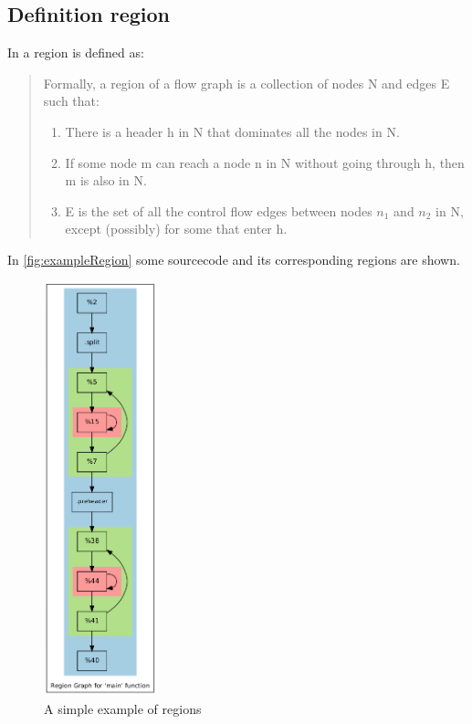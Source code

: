 \subsection{Definition region}
In \cite[chapter 9.7.1, p.~672]{Drachenbuch} a region is defined as:

\begin{quote}
    Formally, a region of a flow graph is a collection of nodes N and edges E such that:
    \begin{enumerate}
        \item There is a header h in N that dominates all the nodes in N.
        \item If some node m can reach a node n in N without going through h, then m is also in N.
        \item E is the set of all the control flow edges between nodes \(n_1\) and \(n_2\) in N, except (possibly) for some that enter h.
    \end{enumerate}
\end{quote}
In \autoref{fig:exampleRegion} some sourcecode and its corresponding regions are shown.
\begin{figure}[!ht]
    \caption{A simple example of regions}
    \label{fig:exampleRegion}
    \begin{minipage}{.7\textwidth}
        
    \end{minipage}
    \begin{minipage}{.2\textwidth}
        \includegraphics[height=12cm]{gfx/matmulRegions.png}
    \end{minipage}
\end{figure}\\

